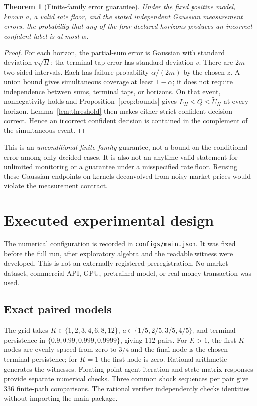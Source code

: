 \documentclass[11pt]{article}
\newtheorem{theorem}{Theorem}[section]
\theoremstyle{remark}\newtheorem{remark}[theorem]{Remark}
\begin{document}
\begin{theorem}[Finite-family error guarantee]\label{thm:ci}
Under the fixed positive model, known $a$, a valid rate floor, and the stated independent Gaussian measurement errors, the probability that any of the four declared horizons produces an incorrect confident label is at most $\alpha$.
\end{theorem}
\begin{proof}
For each horizon, the partial-sum error is Gaussian with standard deviation $v\sqrt H$; the terminal-tap error has standard deviation $v$. There are $2m$ two-sided intervals. Each has failure probability $\alpha/(2m)$ by the chosen $z$. A union bound gives simultaneous coverage at least $1-\alpha$; it does not require independence between sums, terminal taps, or horizons. On that event, nonnegativity holds and Proposition~\ref{prop:bounds} gives $L_H\le Q\le\widetilde U_H$ at every horizon. Lemma~\ref{lem:threshold} then makes either strict confident decision correct. Hence an incorrect confident decision is contained in the complement of the simultaneous event.
\end{proof}
This is an \emph{unconditional finite-family} guarantee, not a bound on the conditional error among only decided cases. It is also not an anytime-valid statement for unlimited monitoring or a guarantee under a misspecified rate floor. Reusing these Gaussian endpoints on kernels deconvolved from noisy market prices would violate the measurement contract.

\section{Executed experimental design}\label{sec:design}
The numerical configuration is recorded in \texttt{configs/main.json}. It was fixed before the full run, after exploratory algebra and the readable witness were developed. This is not an externally registered preregistration. No market dataset, commercial API, GPU, pretrained model, or real-money transaction was used.

\subsection{Exact paired models}
The grid takes $K\in\{1,2,3,4,6,8,12\}$, $a\in\{1/5,2/5,3/5,4/5\}$, and terminal persistence in $\{0.9,0.99,0.999,0.9999\}$, giving 112 pairs. For $K>1$, the first $K$ nodes are evenly spaced from zero to $3/4$ and the final node is the chosen terminal persistence; for $K=1$ the first node is zero. Rational arithmetic generates the witnesses. Floating-point agent iteration and state-matrix responses provide separate numerical checks. Three common shock sequences per pair give 336 finite-path comparisons. The rational verifier independently checks identities without importing the main package.
\end{document}
